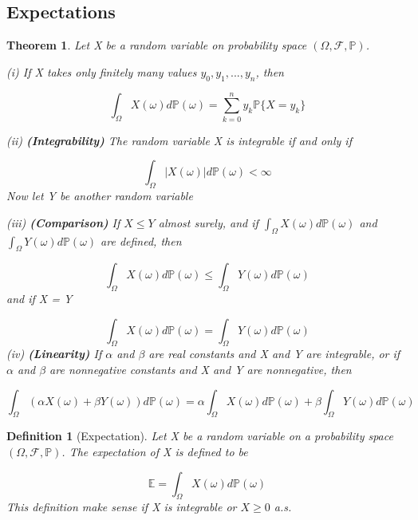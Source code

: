 \documentclass[a4]{article}
\newtheorem{theorem}{Theorem}
\newtheorem{definition}{Definition}
\begin{document}
\subsection{Expectations}
\begin{theorem}
	Let X be a random variable on probability space $(\Omega, \mathcal{F}, \mathbb{P})$.\par 
	\bigbreak 
	(i) If X takes only finitely many values $y_{0}, y_{1},...,y_{n}$, then\par 
	$$
\int_{\Omega} X(\omega)d\mathbb{P}(\omega) = \sum^{n}_{k = 0}y_{k}\mathbb{P}\{X = y_{k}\}
	$$\par 
	\bigbreak 
	(ii) \textbf{(Integrability)} The random variable X is integrable if and only if \par 
	$$
\int_{\Omega}|X(\omega) |d\mathbb{P}(\omega)<\infty
	$$
	\noindent Now let Y be another random variable\par 
	\bigbreak 
	(iii) \textbf{(Comparison)} If $X\leq Y$ almost surely, and if $\int_{\Omega}X(\omega)d\mathbb{P}(\omega)$ and $\int_{\Omega}Y(\omega)d\mathbb{P}(\omega)$ are defined, then\par 
	$$
	\int_{\Omega}X(\omega) d\mathbb{P}(\omega) \leq \int_{\Omega}Y(\omega )d\mathbb{P}(\omega)
	$$
	and if X = Y\par 
	$$
\int_{\Omega}X(\omega) d\mathbb{P}(\omega) = \int_{\Omega}Y(\omega )d\mathbb{P}(\omega)
$$
	\bigbreak 
	(iv) \textbf{(Linearity)} If $\alpha$ and $\beta$ are real constants and X and Y are integrable, or if $\alpha$ and $\beta$ are nonnegative constants and X and Y are nonnegative, then \par
	$$
\int_{\Omega}(\alpha X(\omega) + \beta Y(\omega))d \mathbb{P}(\omega) = \alpha \int_{\Omega}X(\omega)d \mathbb{P}(\omega) + \beta \int_{\Omega}Y(\omega)d \mathbb{P}(\omega)
	$$
\end{theorem}
\begin{definition}[Expectation]
	Let X be a random variable on a probability space $(\Omega, \mathcal{F}, \mathbb{P})$. The expectation of X is defined to be\par 
	$$
\mathbb{E} = \int_{\Omega}X(\omega)d\mathbb{P}(\omega)	$$
This definition make sense if X is integrable or $X\geq 0$ a.s.\par 
\end{definition}
\end{document}
